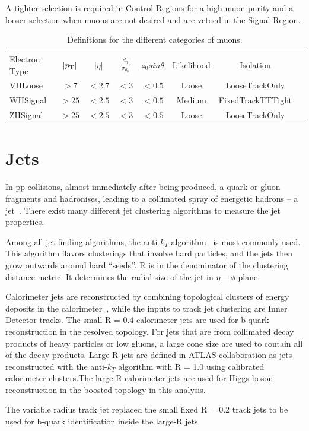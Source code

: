 A tighter selection is required in Control Regions for a high muon purity and a looser selection when muons are not desired and are vetoed in the Signal Region.
\begin{table}[tbh]
\centering
\begin{tabular}{|l|c|c|c|c|c|c|c}

\hline
Electron Type & $|p_{\mathrm{T}}|$ &$|\eta|$ & $\frac{|d_0|}{\sigma_{d_0}}$&$z_0 sin\theta$ & Likelihood &Isolation \\
VHLoose &$>7$&$<2.7$&$<3$&$<0.5$&Loose&LooseTrackOnly\\
WHSignal &$>25$&$<2.5$&$<3$&$<0.5$&Medium&FixedTrackTTTight\\
ZHSignal &$>25$&$<2.5$&$<3$&$<0.5$&Loose&LooseTrackOnly\\
\hline
\end{tabular}
\caption{Definitions for the different categories of muons.}
 \label{tab:mu}
\end{table}


\section{Jets}
\label{sec:jets}
\par In pp collisions, almost immediately after being produced, a quark or gluon fragments and hadronises, leading to a collimated spray of energetic hadrons -- 
a jet~\cite{Salam:2009jx}. There exist many different jet clustering algorithms to measure the jet properties. 
\par Among all jet finding algorithms, the anti-$k_T$ algorithm~\cite{Cacciari:2008gp} is most commonly used. This algorithm flavors clusterings that involve hard particles, 
and the jets then grow outwards around hard ``seeds’’. R is in the denominator of the clustering distance metric. It determines the radial size of the jet in $\eta-\phi$ plane.
\par Calorimeter jets are reconstructed by combining topological clusters of energy deposits in the calorimeter~\cite{Aad:2011he}, while the inputs to track jet clustering are Inner Detector tracks. 
The small R = 0.4 calorimeter jets are used for b-quark reconstruction in the resolved topology. For jets that are from collimated decay products of heavy particles or low \pt gluons, 
a large cone size are used to contain all of the decay products. Large-R jets are defined in ATLAS collaboration as jets reconstructed with the anti-$k_T$ algorithm with R = 1.0 using calibrated 
calorimeter clusters.The large R calorimeter jets are used for Higgs boson reconstruction in the boosted topology in this analysis.
\par The variable radius track jet replaced the small fixed R = 0.2 track jets to be used for b-quark identification inside the large-R jets.

